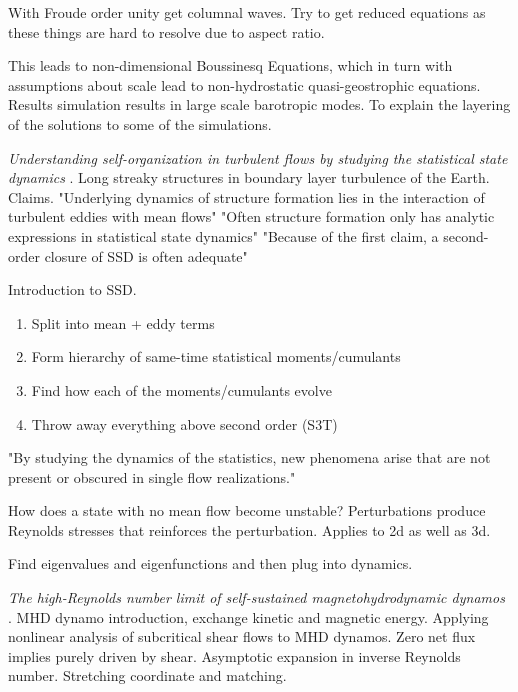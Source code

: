 \begin{description}
{\begin{description}
With Froude order unity get columnal waves. Try to get reduced equations as these things are hard
to resolve due to aspect ratio.

This leads to non-dimensional Boussinesq Equations, which in turn with assumptions about
scale lead to non-hydrostatic quasi-geostrophic equations.
Results simulation results in large scale barotropic modes. To explain the layering
of the solutions to some of the simulations.

\item[N. Constantinou Talk]
\textit{Understanding self-organization in turbulent flows by studying the statistical state dynamics}
.
Long streaky structures in boundary layer turbulence of the Earth.
Claims.
"Underlying dynamics of structure formation lies in the interaction of turbulent eddies with
mean flows"
"Often structure formation only has analytic expressions in statistical state dynamics"
"Because of the first claim, a second-order closure of SSD is often adequate"

Introduction to SSD.
\begin{enumerate}
\item Split into mean + eddy terms
\item Form hierarchy of same-time statistical moments/cumulants
\item Find how each of the moments/cumulants evolve
\item Throw away everything above second order (S3T)
\end{enumerate}

"By studying the dynamics of the statistics, new phenomena arise that are not present or
obscured in single flow realizations."

How does a state with no mean flow become unstable? Perturbations produce Reynolds
stresses that reinforces the perturbation. Applies to 2d as well as 3d.

Find eigenvalues and eigenfunctions and then plug into dynamics.

\item[K. Deguchi]
\textit{The high-Reynolds number limit of self-sustained magnetohydrodynamic dynamos}
.
MHD dynamo introduction, exchange kinetic and magnetic energy.
Applying nonlinear analysis of subcritical shear flows to MHD dynamos. Zero
net flux implies purely driven by shear.
Asymptotic expansion in inverse Reynolds number. Stretching coordinate and matching.


\end{description}}
\end{description}
